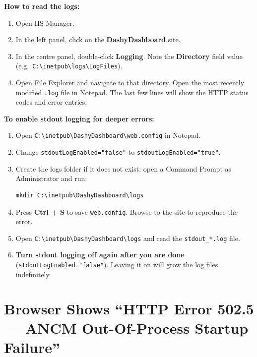 \documentclass[a4paper,11pt]{article}
\begin{document}
\textbf{How to read the logs:}

\begin{enumerate}
  \item Open IIS Manager.
  \item In the left panel, click on the \textbf{DashyDashboard} site.
  \item In the centre panel, double-click \textbf{Logging}.
        Note the \textbf{Directory} field value (e.g.\
        \texttt{C:\textbackslash inetpub\textbackslash logs\textbackslash LogFiles}).
  \item Open File Explorer and navigate to that directory.
        Open the most recently modified \texttt{.log} file in Notepad.
        The last few lines will show the HTTP status codes and error entries.
\end{enumerate}

\textbf{To enable stdout logging for deeper errors:}

\begin{enumerate}
  \item Open \texttt{C:\textbackslash inetpub\textbackslash DashyDashboard\textbackslash web.config} in Notepad.
  \item Change \texttt{stdoutLogEnabled="false"} to \texttt{stdoutLogEnabled="true"}.
  \item Create the logs folder if it does not exist:
        open a Command Prompt as Administrator and run:
\begin{lstlisting}
mkdir C:\inetpub\DashyDashboard\logs
\end{lstlisting}
  \item Press \textbf{Ctrl + S} to save \texttt{web.config}. Browse to the site to reproduce the error.
  \item Open \texttt{C:\textbackslash inetpub\textbackslash DashyDashboard\textbackslash logs}
        and read the \texttt{stdout\_*.log} file.
  \item \textbf{Turn stdout logging off again after you are done}
        (\texttt{stdoutLogEnabled="false"}).
        Leaving it on will grow the log files indefinitely.
\end{enumerate}

\section{Browser Shows ``HTTP Error 502.5 --- ANCM Out-Of-Process Startup Failure''}
\label{sec:ancm502}
\end{document}
